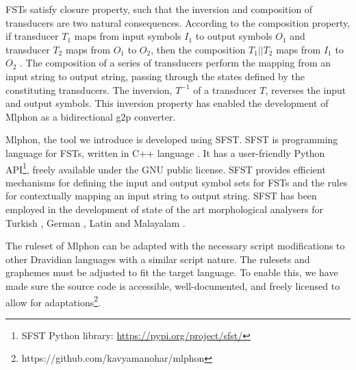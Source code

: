 FSTs satisfy closure property, such that the inversion and composition of
transducers are two natural consequences. According to the composition
property, if transducer $T_1$ maps from input symbols $I_1$ to output symbols
$O_1$ and transducer $T_2$ maps from $O_1$ to $O_2$, then the composition $T_1
	|| T_2 $ maps from $I_1$ to $O_2$ \cite{jurafsky2014speech}. The composition of
a series of transducers perform the mapping from an input string to output
string, passing through the states defined by the constituting transducers. The
inversion, $T^{-1}$ of a transducer $T$, reverses the input and output symbols.
This inversion property has enabled the development of Mlphon as a
bidirectional \gls{g2p} converter.

Mlphon, the tool we introduce is developed using SFST. SFST is programming
language for FSTs, written in C++ language \cite{schmid2005programming}. It has
a user-friendly Python API\footnote{SFST Python library:
	\url{https://pypi.org/project/sfst/}}, freely available under the GNU public
license. SFST provides efficient mechanisms for defining the input and output
symbol sets for FSTs and the rules for contextually mapping an input string to
output string. SFST has been employed in the development of state of the art
morphological analysers for Turkish \cite{kayabacs2019trmor}, German
\cite{schmid-etal-2004-smor}, Latin \cite{springmann2016latmor} and Malayalam
\cite{thottingal2019finite}.

The ruleset of Mlphon can be adapted with the necessary script modifications to
other Dravidian languages with a similar script nature. The rulesets and
graphemes must be adjusted to fit the target language. To enable this, we have
made sure the source code is accessible, well-documented, and freely licensed
to allow for adaptations\footnote{https://github.com/kavyamanohar/mlphon}. 



